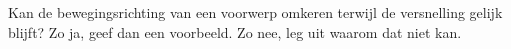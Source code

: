 

\item Kan de bewegingsrichting van een voorwerp omkeren terwijl de versnelling gelijk blijft? Zo ja, geef dan een voorbeeld. Zo nee, leg uit waarom dat niet kan.